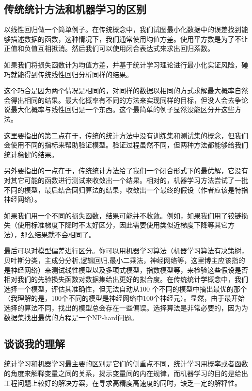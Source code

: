 \subsection{传统统计方法和机器学习的区别}

以线性回归做一个简单例子。在传统概念中，我们试图最小化数据中的误差找到能够描述数据的函数，这种情况下，我们通常使用均值方差。使用平方数是为了不让正值和负值互相抵消。然后我们可以使用闭合表达式来求出回归系数。

如果我们将损失函数计为均值方差，并基于统计学习理论进行最小化实证风险，碰巧就能得到传统线性回归分析同样的结果。

这个巧合是因为两个情况是相同的，对同样的数据以相同的方式求解最大概率自然会得出相同的结果。最大化概率有不同的方法来实现同样的目标，但没人会去争论说最大化概率与线性回归是一个东西。这个最简单的例子显然没能区分开这些方法。

这里要指出的第二点在于，传统的统计方法中没有训练集和测试集的概念，但我们会使用不同的指标来帮助验证模型。验证过程虽然不同，但两种方法都能够给我们统计稳健的结果。

另外要指出的一点在于，传统统计方法给了我们一个闭合形式下的最优解，它没有对其它可能的函数进行测试来收敛出一个结果。相对的，机器学习方法尝试了一批不同的模型，最后结合回归算法的结果，收敛出一个最终的假设（作者应该是特指神经网络）。

如果我们用一个不同的损失函数，结果可能并不收敛。例如，如果我们用了铰链损失（使用标准梯度下降时不太好区分，因此需要使用类似近梯度下降等其它方法），那么结果就不会相同了。

最后可以对模型偏差进行区分。你可以用机器学习算法（机器学习算法有决策树，贝叶斯分类，主成分分析,逻辑回归,最小二乘法，神经网络等，这里博主应该指的是神经网络）来测试线性模型以及多项式模型，指数模型等，来检验这些假设是否相对我们的先验损失函数对数据集给出更好的拟合度。在传统统计学概念中，我们选择一个模型，评估其准确性，但无法自动从100 个不同的模型中摘出最优的那个（我理解的是，100个不同的模型是神经网络中100个神经元）。显然，由于最开始选择的算法不同，找出的模型总会存在一些偏误。选择算法是非常必要的，因为为数据集找出最优的方程是一个NP-hard问题。

\subsection{谈谈我的理解}

统计学习和机器学习最主要的区别是它们的侧重点不同，统计学习用概率或者函数的角度来解释变量之间的关系，揭示变量间的内在规律，而机器学习的目的是给出工程问题上较好的解决方案，在寻求高精度高速度的同时，缺乏一定的解释性。

